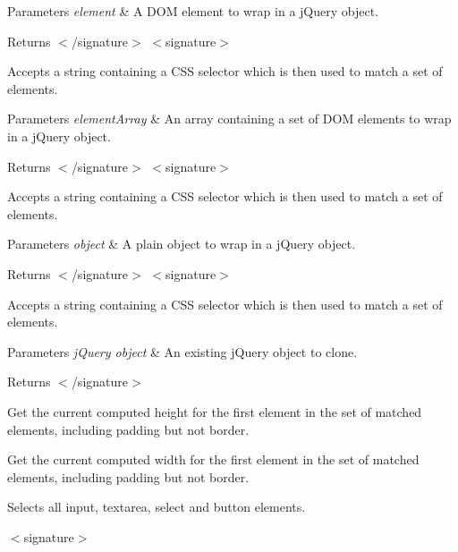 \begin{DoxyParams}{Parameters}
{\em element} & A D\-O\-M element to wrap in a j\-Query object.\\
\hline
\end{DoxyParams}
\begin{DoxyReturn}{Returns}
$<$/signature$>$ $<$signature$>$ 

Accepts a string containing a C\-S\-S selector which is then used to match a set of elements.
\end{DoxyReturn}

\begin{DoxyParams}{Parameters}
{\em element\-Array} & An array containing a set of D\-O\-M elements to wrap in a j\-Query object.\\
\hline
\end{DoxyParams}
\begin{DoxyReturn}{Returns}
$<$/signature$>$ $<$signature$>$ 

Accepts a string containing a C\-S\-S selector which is then used to match a set of elements.
\end{DoxyReturn}

\begin{DoxyParams}{Parameters}
{\em object} & A plain object to wrap in a j\-Query object.\\
\hline
\end{DoxyParams}
\begin{DoxyReturn}{Returns}
$<$/signature$>$ $<$signature$>$ 

Accepts a string containing a C\-S\-S selector which is then used to match a set of elements.
\end{DoxyReturn}

\begin{DoxyParams}{Parameters}
{\em j\-Query object} & An existing j\-Query object to clone.\\
\hline
\end{DoxyParams}
\begin{DoxyReturn}{Returns}
$<$/signature$>$ 

Get the current computed height for the first element in the set of matched elements, including padding but not border.

Get the current computed width for the first element in the set of matched elements, including padding but not border.

Selects all input, textarea, select and button elements.
\end{DoxyReturn}
$<$signature$>$ 

